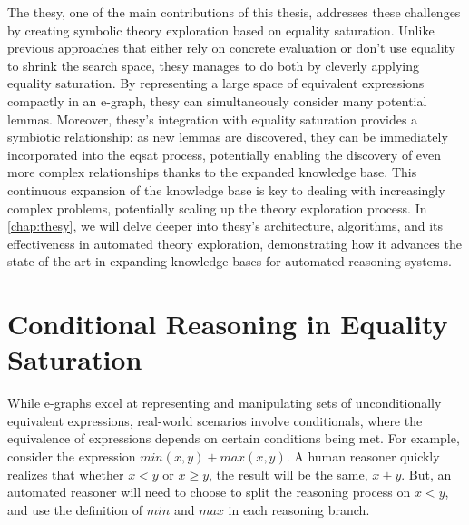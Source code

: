 The \gls{thesy}, one of the main contributions of this thesis, addresses these challenges by creating symbolic theory exploration based on equality saturation.
Unlike previous approaches that either rely on concrete evaluation or don't use equality to shrink the search space, \gls{thesy} manages to do both by cleverly applying equality saturation.
By representing a large space of equivalent expressions compactly in an e-graph, \gls{thesy} can simultaneously consider many potential lemmas. 
Moreover, \gls{thesy}'s integration with equality saturation provides a symbiotic relationship: as new lemmas are discovered, they can be immediately incorporated into the \gls{eqsat} process, potentially enabling the discovery of even more complex relationships thanks to the expanded knowledge base.
This continuous expansion of the knowledge base is key to dealing with increasingly complex problems, potentially scaling up the theory exploration process.
In \autoref{chap:thesy}, we will delve deeper into \gls{thesy}'s architecture, algorithms, and its effectiveness in automated theory exploration, demonstrating how it advances the state of the art in expanding knowledge bases for automated reasoning systems.


\section{Conditional Reasoning in Equality Saturation}

While e-graphs excel at representing and manipulating sets of unconditionally equivalent expressions,
real-world scenarios involve conditionals, where the equivalence of expressions depends on certain conditions being met. 
For example, consider the expression $min(x,y) + max(x,y)$.
A human reasoner quickly realizes that whether $x < y$ or $x \geq y$, the result will be the same, $x + y$.
But, an automated reasoner will need to choose to split the reasoning process on $x < y$, and use the definition of $min$ and $max$ in each reasoning branch.

